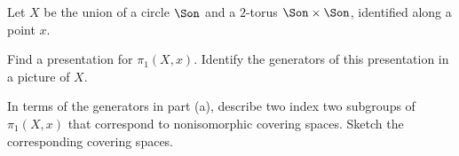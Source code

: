 Let $X$ be the union of a circle $\Son$ and a $2$-torus $\Son\times
\Son$, identified along a point $x$. 
\begin{alist}
\item Find a presentation for $\pi_1(X,x)$. Identify the generators 
of this presentation in a picture of $X$.
\item In terms of the generators in part (a), describe two index 
two subgroups of $\pi_1(X,x)$ that correspond to nonisomorphic
covering spaces.  Sketch the corresponding covering spaces.
\end{alist}
